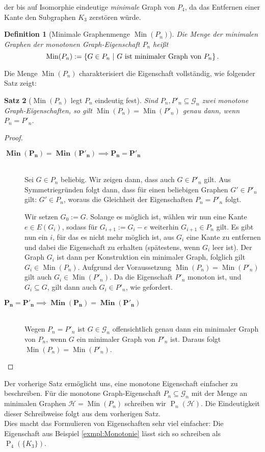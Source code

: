 \documentclass[10pt,a4paper, footheight=1mm]{scrreprt}
\newtheorem{definition}{Definition}
\newtheorem{Satz}[definition]{Satz}
\theoremstyle{definition}
\DeclareMathOperator\Min{Min}
\begin{document}
der bis auf Isomorphie eindeutige \emph{minimale} 
Graph von $P_4$, da das Entfernen einer Kante
den Subgraphen $K_3$ zerstören würde.

\begin{definition}[Minimale Graphenmenge $\Min(P_n)$]
Die Menge der minimalen Graphen der monotonen Graph-Eigenschaft
$P_n$ heißt
$$\Min(P_n) := \{ G\in P_n \ | \ G \textup{ ist minimaler Graph von } P_n\}\,.$$
\end{definition}

Die Menge $\Min(P_n)$ charakterisiert die
Eigenschaft vollständig, wie folgender Satz zeigt:

\begin{Satz}[$\Min(P_n)$ legt $P_n$ eindeutig fest]
Sind $P_n, P'_n \subseteq \mathcal{G}_n$ zwei monotone 
Graph-Eigenschaften, so gilt
$\Min(P_n) = \Min(P'_n)$ genau dann, wenn $P_n = P'_n$.
\end{Satz}
\begin{proof} \hfill
\vspace*{-3mm}
\begin{description}
\item[$\boldsymbol{\Min(P_n) = \Min(P'_n) \implies P_n = P'_n}$]
\hfill \\
Sei $G \in P_n$ beliebig. Wir zeigen dann, dass auch $G \in P'_n$
gilt. Aus Symmetriegründen folgt dann, dass für einen  beliebigen
Graphen $G' \in P'_n$ gilt: $G' \in P_n$, woraus die Gleichheit der
Eigenschaften $P_n = P'_n$ folgt.

Wir setzen $G_0 := G$. Solange es möglich ist, wählen wir nun
eine Kante $e \in E(G_i)$, sodass für $G_{i+1} := G_i - e$  
weiterhin $G_{i+1} \in P_n$ gilt.
Es gibt nun ein $i$, für das es nicht mehr möglich ist,
aus $G_i$ eine Kante zu entfernen und dabei die Eigenschaft
zu erhalten (spätestens, wenn $G_i$ leer ist).
Der Graph $G_i$ ist dann per Konstruktion ein minimaler
Graph, folglich gilt $G_i \in \Min(P_n)$. Aufgrund der
Voraussetzung $\Min(P_n) = \Min(P'_n)$ gilt auch 
$G_i \in \Min(P'_n)$. Da die Eigenschaft $P'_n$ monoton ist,
und $G_i \subseteq G$, gilt dann auch $G_i \in P'_n$,
wie gefordert.
\vspace*{-2mm}
\item[$\boldsymbol{P_n = P'_n \implies \Min(P_n) = \Min(P'_n)}$]
\hfill \\
Wegen $P_n = P'_n$ ist $G \in \mathcal{G}_n$ offensichtlich
genau dann ein minimaler Graph von $P_n$, wenn $G$ ein 
minimaler Graph von $P'_n$ ist. Daraus folgt 
$\Min(P_n) = \Min(P'_n)$. \qedhere
\end{description}
\end{proof}
Der vorherige Satz ermöglicht uns, eine
monotone Eigenschaft einfacher zu beschreiben. 
Für die monotone Graph-Eigenschaft $P_n\subseteq \mathcal{G}_n$
mit der Menge an minimalen Graphen $\mathcal{H} = \Min(P_n)$
schreiben wir $\operatorname{P}_n(\mathcal{H})$. Die Eindeutigkeit dieser
Schreibweise folgt aus dem vorherigen Satz. \\
Dies macht das Formulieren von Eigenschaften sehr viel einfacher:
Die Eigenschaft aus Beispiel \ref{exmpl:Monotonie} lässt sich
so schreiben als $\operatorname{P}_4(\{K_3\})$.
\end{document}
